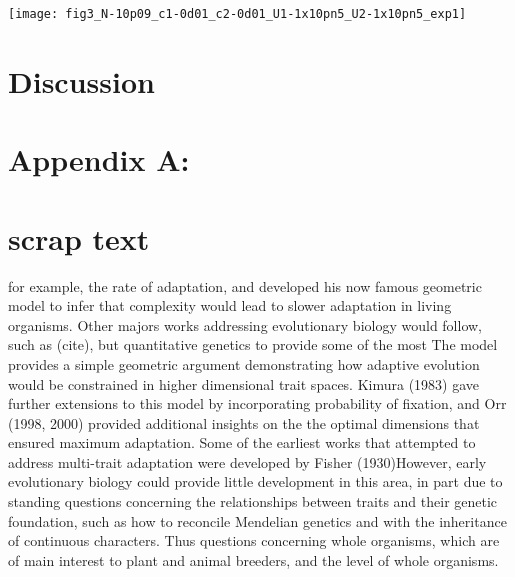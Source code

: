 \documentclass[11pt,one column]{article}
\begin{document}
\begin{multicols}{2}
{\centering
\texttt{[image: fig3\_N-10p09\_c1-0d01\_c2-0d01\_U1-1x10pn5\_U2-1x10pn5\_exp1]}
\label{fig.2}}

\section*{Discussion}




\end{multicols}

\newpage

\section*{Appendix A:}

\section*{scrap text}
 for example,  the rate of adaptation, and developed his now famous geometric model to infer that complexity would lead to slower adaptation in living organisms.  Other majors works addressing evolutionary biology would follow, such as (cite), but quantitative genetics to provide some of the most The model provides a simple geometric argument demonstrating how adaptive evolution would be constrained in higher dimensional trait spaces.  Kimura (1983) gave further extensions to this model by incorporating probability of fixation, and Orr (1998, 2000) provided additional insights on the the optimal dimensions that ensured maximum adaptation.  Some of the earliest works that attempted to address multi-trait adaptation were developed by Fisher (1930)However, early evolutionary biology could provide little development in this area, in part due to standing questions concerning the relationships between traits and their genetic foundation, such as how to reconcile Mendelian genetics and with the inheritance of continuous characters. Thus questions concerning whole organisms, which are of main interest to plant and animal breeders, and the level of whole organisms.\par
\end{document}

